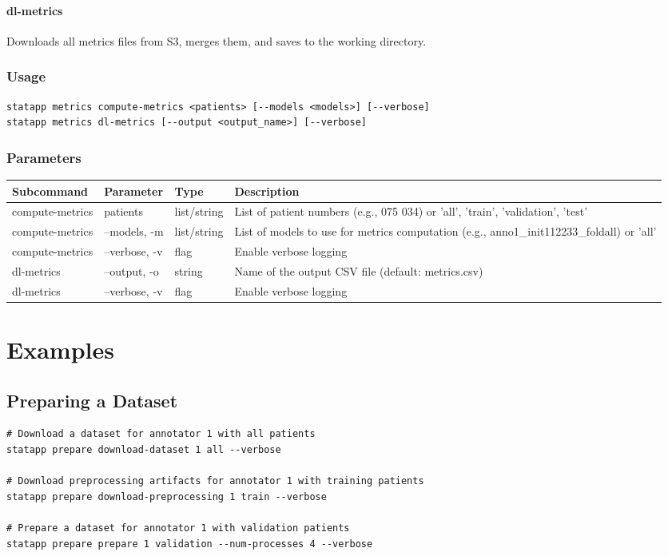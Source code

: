 \documentclass{article}
\begin{document}
\paragraph{dl-metrics}
Downloads all metrics files from S3, merges them, and saves to the working directory.

\subsubsection{Usage}
\begin{lstlisting}
statapp metrics compute-metrics <patients> [--models <models>] [--verbose]
statapp metrics dl-metrics [--output <output_name>] [--verbose]
\end{lstlisting}

\subsubsection{Parameters}
\begin{tabulary}{\linewidth}{LLLL}
\toprule
\textbf{Subcommand} & \textbf{Parameter} & \textbf{Type} & \textbf{Description} \\
\midrule
compute-metrics & patients & list/string & List of patient numbers (e.g., 075 034) or 'all', 'train', 'validation', 'test' \\
compute-metrics & --models, -m & list/string & List of models to use for metrics computation (e.g., anno1\_init112233\_foldall) or 'all' \\
compute-metrics & --verbose, -v & flag & Enable verbose logging \\
\midrule
dl-metrics & --output, -o & string & Name of the output CSV file (default: metrics.csv) \\
dl-metrics & --verbose, -v & flag & Enable verbose logging \\
\bottomrule
\end{tabulary}

\section{Examples}

\subsection{Preparing a Dataset}
\begin{lstlisting}
# Download a dataset for annotator 1 with all patients
statapp prepare download-dataset 1 all --verbose

# Download preprocessing artifacts for annotator 1 with training patients
statapp prepare download-preprocessing 1 train --verbose

# Prepare a dataset for annotator 1 with validation patients
statapp prepare prepare 1 validation --num-processes 4 --verbose
\end{lstlisting}
\end{document}
